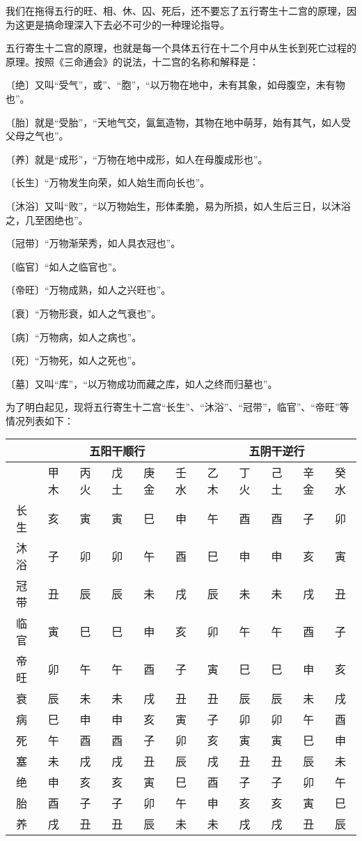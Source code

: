 \documentclass[a5paper,oneside,12pt]{ctexbook}
\begin{document}
我们在拖得五行的旺、相、休、囚、死后，还不要忘了五行寄生十二宫的原理，因为这更是搞命理深入下去必不可少的一种理论指导。

五行寄生十二宫的原理，也就是每一个具体五行在十二个月中从生长到死亡过程的原理。按照《三命通会》的说法，十二宫的名称和解释是：

〔绝〕又叫“受气”，或”、“胞”，“以万物在地中，未有其象，如母腹空，未有物也”。

〔胎〕就是“受胎”，“天地气交，氤氳造物，其物在地中萌芽，始有其气，如人受父母之气也”。

〔养〕就是“成形”，“万物在地中成形，如人在母腹成形也”。

〔长生〕“万物发生向荣，如人始生而向长也”。

〔沐浴〕又叫“败”，“以万物始生，形体柔脆，易为所损，如人生后三日，以沐浴之，几至困绝也”。

〔冠带〕“万物渐荣秀，如人具衣冠也”。

〔临官〕“如人之临官也”。

〔帝旺〕“万物成熟，如人之兴旺也”。

〔衰〕“万物形衰，如人之气衰也”。

〔病〕“万物病，如人之病也”。

〔死〕“万物死，如人之死也”。

〔墓〕又叫“库”，“以万物成功而藏之库，如人之终而归墓也”。

为了明白起见，现将五行寄生十二宫“长生”、“沐浴”、“冠带”，临官”、“帝旺”等情况列表如下：
\begin{table}[H]
\centering
\setlength{\tabcolsep}{0.1em} %
\begin{tabular}{*{10}{c|}c}
\hline
&\multicolumn{5}{c|}{五阳干顺行}&\multicolumn{5}{c}{五阴干逆行}\\
\hline
&甲木&丙火&戊土&庚金&壬水&乙木&丁火&己土&辛金&癸水\\
\hline
长生&亥&寅&寅&巳&申&午&酉&酉&子&卯\\
沐浴&子&卯&卯&午&酉&巳&申&申&亥&寅\\
冠带&丑&辰&辰&未&戌&辰&未&未&戌&丑\\
临官&寅&巳&巳&申&亥&卯&午&午&酉&子\\
帝旺&卯&午&午&酉&子&寅&巳&巳&申&亥\\
衰&辰&未&未&戌&丑&丑&辰&辰&未&戌\\
病&巳&申&申&亥&寅&子&卯&卯&午&酉\\
死&午&酉&酉&子&卯&亥&寅&寅&巳&申\\
塞&未&戌&戌&丑&辰&戌&丑&丑&辰&未\\
绝&申&亥&亥&寅&巳&酉&子&子&卯&午\\
胎&酉&子&子&卯&午&申&亥&亥&寅&巳\\
养&戌&丑&丑&辰&未&未&戌&戌&丑&辰\\
\hline
\end{tabular}
\end{table}
\end{document}
